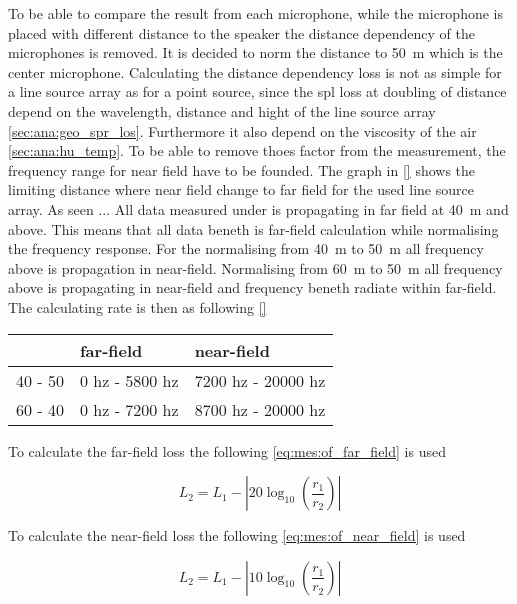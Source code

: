 To be able to compare the result from each microphone, while the microphone is placed with different distance to the speaker the distance dependency of the microphones is removed. It is decided to norm the distance to \SI{50}{\meter} which is the center microphone. Calculating the distance dependency loss is not as simple for a line source array as for a point source, since the \gls{spl} loss at doubling of distance depend on the wavelength, distance and hight of the line source array \autoref{sec:ana:geo_spr_los}. Furthermore it also depend on the viscosity of the air \autoref{sec:ana:hu_temp}. To be able to remove thoes factor from the measurement, the frequency range for near field have to be founded. The graph in \autoref{} shows the limiting distance where near field change to far field for the used line source array. As seen    ... All data measured under  is propagating in far field at \SI{40}{\meter} and above. This means that all data beneth  is far-field calculation while normalising the frequency response. For the normalising from \SI{40}{\meter} to \SI{50}{\meter} all frequency above  is propagation in near-field. Normalising from \SI{60}{\meter} to \SI{50}{\meter} all frequency above  is propagating in near-field and frequency beneth  radiate within far-field. The calculating rate is then as following \autoref{}

\begin{table}[H]
\begin{tabular}{l|ll}
        & far-field      & near-field         \\ \hline
40 - 50 & 0 hz - 5800 hz & 7200 hz - 20000 hz \\
60 - 40 & 0 hz - 7200 hz & 8700 hz - 20000 hz
\end{tabular}
\end{table}


To calculate the far-field loss the following \autoref{eq:mes:of_far_field} is used 

\begin{equation}\label{eq:mes:of_far_field}
L_2 = L_1-\left | 20 \log_{10}(\frac{r_1}{r_2}) \right |
\end{equation}

To calculate the near-field loss the following \autoref{eq:mes:of_near_field} is used 

\begin{equation}\label{eq:mes:of_near_field}
L_2 = L_1-\left | 10 \log_{10}(\frac{r_1}{r_2}) \right |
\end{equation}

